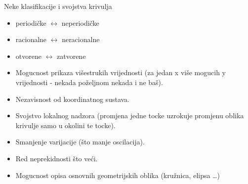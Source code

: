 \documentclass[9pt]{beamer}
\begin{document}
\begin{frame}{Neke klasifikacije  i svojstva krivulja}
	\begin{itemize}
		\item periodičke $\leftrightarrow$ neperiodičke
		\item racionalne $\leftrightarrow$ neracionalne
		\item otvorene $\leftrightarrow$ zatvorene
	\end{itemize}
	\begin{itemize}
		\item Mogucnost prikaza višestrukih vrijednosti (za jedan x više mogucih y vrijednosti - nekada poželjnom nekada i ne baš).
		\item Nezavisnost od koordinatnog sustava.
		\item Svojstvo lokalnog nadzora (promjena jedne tocke uzrokuje promjenu oblika krivulje samo u 	okolini te tocke).
		\item Smanjenje varijacije (što manje oscilacija).
		\item Red neprekidnosti što veći.
		\item Mogucnost opisa osnovnih geometrijskih oblika (kružnica, elipsa \ldots )
	\end{itemize}	
\end{frame}	
\end{document}

